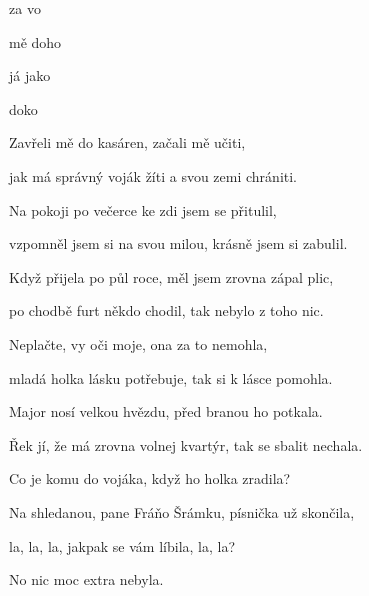 

\zs
{} za vo

 mě doho

já  jako 

 doko

    
\ks

\zs
Zavřeli mě do kasáren, začali mě učiti,

jak má správný voják žíti a svou zemi chrániti.
\ks

\zs
Na pokoji po večerce ke zdi jsem se přitulil,

vzpomněl jsem si na svou milou, krásně jsem si zabulil.
\ks

\zs
Když přijela po půl roce, měl jsem zrovna zápal plic,

po chodbě furt někdo chodil, tak nebylo z toho nic.
\ks

\zs
Neplačte, vy oči moje, ona za to nemohla,

mladá holka lásku potřebuje, tak si k lásce pomohla.
\ks

\zs
Major nosí velkou hvězdu, před branou ho potkala.

Řek jí, že má zrovna volnej kvartýr, tak se sbalit nechala.
\ks

\zs
Co je komu do vojáka, když ho holka zradila?

Na shledanou, pane Fráňo Šrámku, písnička už skončila,

la, la, la, jakpak se vám líbila, la, la?

No nic moc extra nebyla.
\ks

\kp
